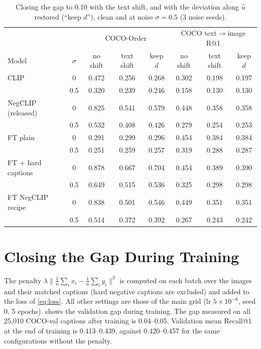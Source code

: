 \documentclass{article}
\newcommand{\uhat}{\hat{u}}
\begin{document}
\begin{table}[H]
\caption{Closing the gap to 0.10 with the text shift, and with the deviation along $\uhat$ restored (``keep $d$''), clean and at noise $\sigma=0.5$ (3 noise seeds).}
\label{tab:x_keep}
\begin{center}
\begin{small}
\begin{tabular}{lccccccc}
\toprule
& & \multicolumn{3}{c}{COCO-Order} & \multicolumn{3}{c}{COCO text$\to$image R@1} \\
Model & $\sigma$ & no shift & text shift & keep $d$ & no shift & text shift & keep $d$ \\
\midrule
CLIP & 0 & 0.472 & 0.256 & 0.268 & 0.302 & 0.198 & 0.197 \\
 & 0.5 & 0.320 & 0.239 & 0.246 & 0.158 & 0.130 & 0.130 \\
NegCLIP (released) & 0 & 0.825 & 0.541 & 0.579 & 0.448 & 0.358 & 0.358 \\
 & 0.5 & 0.532 & 0.408 & 0.426 & 0.279 & 0.254 & 0.253 \\
FT plain & 0 & 0.291 & 0.299 & 0.296 & 0.454 & 0.384 & 0.384 \\
 & 0.5 & 0.251 & 0.259 & 0.257 & 0.319 & 0.288 & 0.287 \\
FT + hard captions & 0 & 0.878 & 0.667 & 0.704 & 0.454 & 0.389 & 0.390 \\
 & 0.5 & 0.649 & 0.515 & 0.536 & 0.325 & 0.298 & 0.298 \\
FT NegCLIP recipe & 0 & 0.838 & 0.501 & 0.546 & 0.449 & 0.351 & 0.351 \\
 & 0.5 & 0.514 & 0.372 & 0.392 & 0.267 & 0.243 & 0.242 \\
\bottomrule
\end{tabular}
\end{small}
\end{center}
\end{table}

\section{Closing the Gap During Training}
\label{app:gapreg}

The penalty $\lambda\lVert\frac{1}{n}\sum_i x_i-\frac{1}{n}\sum_i y_i\rVert^2$ is computed on each batch over the images and their matched captions (hard negative captions are excluded) and added to the loss of \cref{eq:loss}. All other settings are those of the main grid (lr $5{\times}10^{-6}$, seed 0, 5 epochs).  shows the validation gap during training. The gap measured on all 25,010 COCO-val captions after training is 0.04--0.05. Validation mean Recall@1 at the end of training is 0.413--0.439, against 0.420--0.457 for the same configurations without the penalty.
\end{document}
